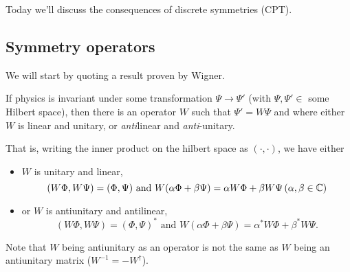 Today we'll discuss the consequences of discrete symmetries (CPT).
\subsection*{Symmetry operators}
We will start by quoting a result proven by Wigner. 
\begin{thm}
If physics is invariant under some transformation $\Psi\to \Psi'$ (with $\Psi,\Psi'\in$ some Hilbert space), then there is an operator $W$ such that $\Psi'=W\Psi$ and where either $W$ is linear and unitary, or \emph{anti}linear and \emph{anti}-unitary.
\end{thm}
That is, writing the inner product on the hilbert space as $(\cdot,\cdot)$, we have either
\begin{itemize}
    \item $W$ is unitary and linear,
    \begin{equation}
        (W\Phi,W\Psi)=(\Phi,\Psi) \text{ and }W(\alpha \Phi+\beta \Psi)=\alpha W\Phi + \beta W \Psi \, (\alpha,\beta \in \mathbb{C})
    \end{equation}
    \item or $W$ is antiunitary and antilinear, 
    \begin{equation}
        (W\Phi,W\Psi)=(\Phi,\Psi)^*\text{ and } W(\alpha \Phi+\beta \Psi)=\alpha^* W\Phi + \beta^* W \Psi.
    \end{equation}
\end{itemize}
Note that $W$ being antiunitary as an operator is not the same as $W$ being an antiunitary matrix ($W^{-1} = -W^\dagger$).

